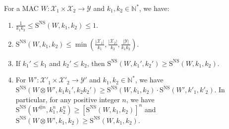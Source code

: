 \begin{proposition}
  \label{prop:oneShot}
  For a MAC $W: \mathcal{X}_1 \times \mathcal{X}_2 \rightarrow \mathcal{Y}$ and $k_1,k_2 \in \mathbb{N}^*$, we have:
  \begin{enumerate}
  \item $\frac{1}{k_1k_2} \leq \mathrm{S}^{\mathrm{NS}}(W,k_1,k_2) \leq 1$.
  \item $\mathrm{S}^{\mathrm{NS}}(W,k_1,k_2) \leq \min\left(\frac{|\mathcal{X}_1|}{k_1}, \frac{|\mathcal{X}_2|}{k_2}, \frac{|\mathcal{Y}|}{k_1k_2} \right)$.
  \item If $k_1' \leq k_1$ and $k_2' \leq k_2$, then $\mathrm{S}^{\mathrm{NS}}(W,k_1',k_2') \geq \mathrm{S}^{\mathrm{NS}}(W,k_1,k_2)$.
    
  \item For $W': \mathcal{X}'_1 \times \mathcal{X}'_2 \rightarrow \mathcal{Y}'$ and $k_1,k_2 \in \mathbb{N}^*$, we have $\mathrm{S}^{\mathrm{NS}}(W \otimes W',k_1k_1',k_2k_2') \geq \mathrm{S}^{\mathrm{NS}}(W,k_1,k_2) \cdot \mathrm{S}^{\mathrm{NS}}(W',k'_1,k'_2)$. In particular, for any positive integer $n$, we have $\mathrm{S}^{\mathrm{NS}}(W^{\otimes n},k_1^n,k_2^n) \geq \left[\mathrm{S}^{\mathrm{NS}}(W,k_1,k_2)\right]^n$ and $\mathrm{S}^{\mathrm{NS}}(W \otimes W',k_1,k_2) \geq \mathrm{S}^{\mathrm{NS}}(W,k_1,k_2)$.
  \end{enumerate}
\end{proposition}
